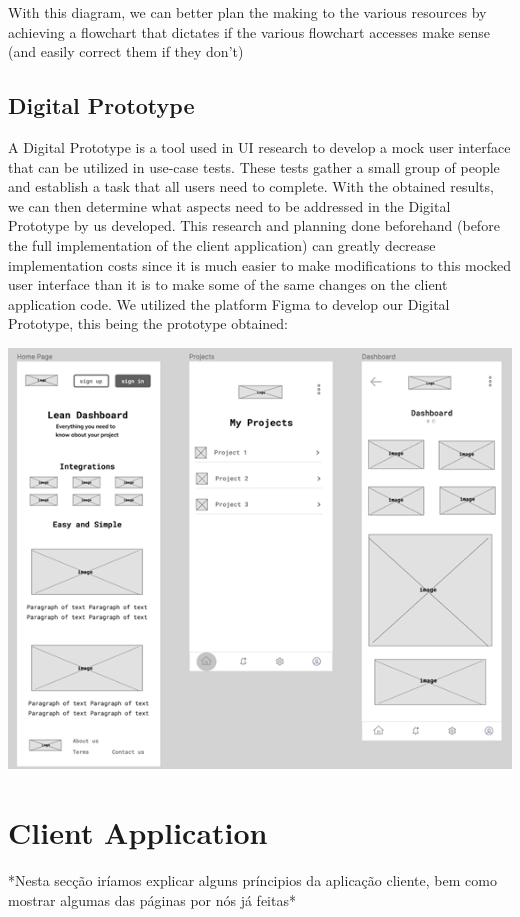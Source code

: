 \documentclass[a4paper,twoside,10pt]{report}
\begin{document}
With this diagram, we can better plan the making to the various resources by achieving a flowchart that dictates if the various flowchart accesses make sense (and easily correct them if they don't)

\section{Digital Prototype}
A Digital Prototype is a tool used in UI research to develop a mock user interface that can be utilized in use-case tests. These tests gather a small group of people and establish a task that all users need to complete. 
With the obtained results, we can then determine what aspects need to be addressed in the Digital Prototype by us developed.
This research and planning done beforehand (before the full implementation of the client application) can greatly decrease implementation costs since it is much easier to make modifications to this mocked user interface than it is to make some of the same changes on the client application code.
We utilized the platform Figma\cite{FIGMA} to develop our Digital Prototype, this being the prototype obtained:
\\ \newline
\begin{center}
    \includegraphics[width=\textwidth]{digital-prototype.png}
\end{center}

\chapter{Client Application}
*Nesta secção iríamos explicar alguns príncipios da aplicação cliente, bem como mostrar algumas das páginas por nós já feitas*
\end{document}
